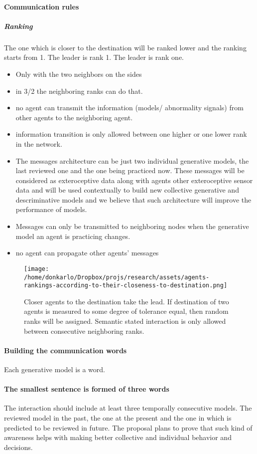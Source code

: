 \documentclass{article}
\begin{document}
			\paragraph{Communication rules}
				\subparagraph{Ranking}
				The one which is closer to the destination will be ranked lower and the ranking starts from 1. The leader is rank 1. The leader is rank one.   
				\begin{itemize}
					\item Only with the two neighbors on the sides
					\item in 3/2 the neighboring ranks can do that.
					\item no agent can transmit the information (models/ abnormality signals) from other agents to the neighboring agent.
					\item information transition is only allowed between one higher or one lower rank in the network.
					\item The messages architecture can be just two individual generative models, the last reviewed one and the one being practiced now. These messages will be considered as exteroceptive data along with agents other exteroceptive sensor data and will be used contextually to build new collective generative and descriminative models and we believe that such architecture will improve the performance of models.
					\item Messages can only be transmitted to neighboring nodes when the generative model an agent is practicing changes.
					\item no agent can propagate other agents' messages
				\end{itemize}
			\begin{figure*}
				\centering
				\texttt{[image: /home/donkarlo/Dropbox/projs/research/assets/agents-rankings-according-to-their-closeness-to-destination.png]}
				\caption{Closer agents to the destination take the lead. If destination of two agents is measured to some degree of tolerance equal, then random ranks will be assigned. Semantic stated interaction is only allowed between consecutive neighboring ranks.}
				\label{fig:agents-rankings-according-to-their-closeness-to-destination.png}
			\end{figure*}
		\paragraph{Building the communication words}
			Each generative model is a word. 
			\paragraph{The smallest sentence is formed of three words}
			The interaction should include at least three temporally consecutive models. The reviewed model in the past, the one at the present and the one in which is predicted to be reviewed in future. The proposal plans to prove that such kind of awareness helps with making better collective and individual behavior and decisions.
\end{document}
